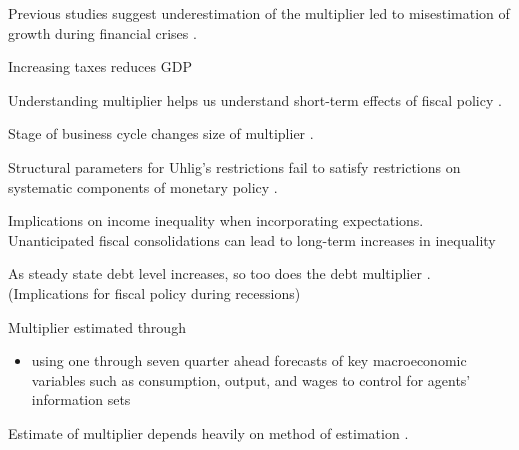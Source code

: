 
Previous studies suggest underestimation of the multiplier led to misestimation of growth during financial crises \parencite{blanchard2013growth}.  

Increasing taxes reduces GDP \parencite{barro2011macroeconomic}

Understanding multiplier helps us understand short-term effects of fiscal policy \parencite{eyraud2013challenge}.

Stage of business cycle changes size of multiplier \parencite{baum2012fiscal}.


Structural parameters for Uhlig's restrictions fail to satisfy restrictions on systematic components of monetary policy \parencite{arias2019systematic}.

Implications on income inequality when incorporating expectations.  Unanticipated fiscal consolidations can lead to long-term increases in inequality \parencite{furceri2022distributional}

As steady state debt level increases, so too does the debt multiplier \parencite{albonico2021public}.  (Implications for fiscal policy during recessions)


Multiplier estimated through
\begin{itemize}
    \item using one through seven quarter ahead forecasts of key macroeconomic variables such as consumption, output, and wages to control for agents' information sets \parencite{hall2023economic}
\end{itemize}


Estimate of multiplier depends heavily on method of estimation \parencite{gechert2012fiscal}.


